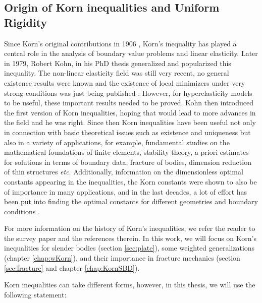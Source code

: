 \subsection{Origin of Korn inequalities and Uniform Rigidity}
Since Korn’s original contributions in 1906
\cite{Korn1, Korn2}, Korn’s inequality has played a central role in
the analysis of boundary value problems and linear elasticity. Later in 1979, Robert Kohn, in his PhD thesis \cite{KohnThesis} generalized and popularized this inequality. The non-linear elasticity field was still very recent, no general existence results were known and the existence of local minimizers under very strong conditions was just being published \cite{john}. However, for hyperelasticity models to be useful, these important results needed to be proved. Kohn then introduced the first version of Korn inequalities, hoping that would lead to more advances in the field and he was right. 
Since then Korn inequalities have been useful not only in connection with basic theoretical issues such as existence and uniqueness but also in a variety of applications, for example, fundamental studies on the mathematical foundations of finite elements, stability theory, a priori estimates for solutions in terms of boundary data, fracture of bodies, dimension reduction of thin structures \textit{etc}.
Additionally,  information on the dimensionless optimal constants appearing in the inequalities, the Korn
constants were shown to also be of importance in many applications, and in the last decades, a lot of effort has been put into finding the optimal constants for different geometries and boundary conditions \cite{bib:Gra.Har.1,bib:Harutyunyan.1,bib:Gra.Har.4,bib:Harutyunyan.2,andre}.

For more information on the history of Korn's inequalities, we refer the reader to the survey paper \cite{bib:Horgan} and the references therein. In this work, we will focus on Korn's inequalities for slender bodies (section \ref{sec:plate}), some weighted generalizations (chapter \ref{chap:wKorn}), and their importance in fracture mechanics (section \ref{sec:fracture} and chapter \ref{chap:KornSBD}).

Korn inequalities can take different forms, however, in this thesis, we will use the following statement:

